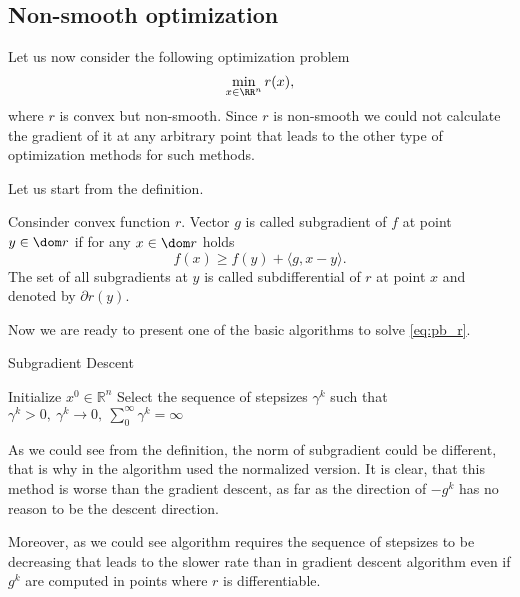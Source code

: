 \subsection{Non-smooth optimization}
Let us now consider the following optimization problem
\begin{equation}\label{eq:pb_r}
\min_{x\in\RR^n} r(x),
\end{equation}
where $r$ is convex but non-smooth. Since $r$ is non-smooth we could not calculate the gradient of it at any arbitrary point that leads to the other type of optimization methods for such methods.

Let us start from the definition.

\begin{definition}[Subgradient]
Consinder convex function $r$. Vector $g$ is called subgradient of $f$ at point $y\in\dom r$ if for any $x\in\dom r$ holds
\begin{equation}\label{eq:subgrad}
f(x)\geq f(y) + \langle g, x-y\rangle.
\end{equation}
The set of all subgradients at $y$ is called subdifferential of $r$ at point $x$ and denoted by $\partial r(y)$.
\end{definition}

Now we are ready to present one of the basic algorithms to solve \eqref{eq:pb_r}.

\begin{algorithm}
    \caption{Subgradient Descent}
    \label{algo:sd}
    \begin{algorithmic}
        \STATE Initialize $x^0\in\mathbb{R}^n$
        \STATE Select the sequence of stepsizes $\gamma^k$ such that
        $
            \gamma^k>0,~\gamma^k\rightarrow 0,~\sum_0^\infty \gamma^k = \infty
        $
        \ENDFOR
    \end{algorithmic}
\end{algorithm}

As we could see from the definition, the norm of subgradient could be different, that is why in the algorithm used the normalized version. It is clear, that this method is worse than the gradient descent, as far as the direction of $-g^k$ has no reason to be the descent direction.

Moreover, as we could see algorithm requires the sequence of stepsizes to be decreasing that leads to the slower rate than in gradient descent algorithm even if $g^k$ are computed in points where $r$ is differentiable.








